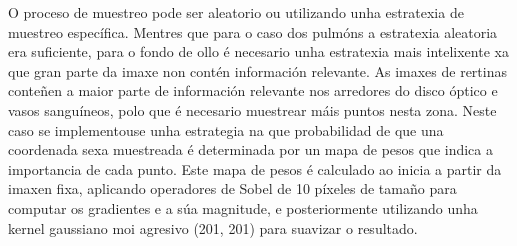 O proceso de muestreo pode ser aleatorio ou utilizando unha estratexia de muestreo específica.
Mentres que para o caso dos pulmóns a estratexia aleatoria era suficiente, para o fondo de ollo é necesario unha estratexia mais intelixente xa que gran parte da imaxe non contén información relevante.
As imaxes de rertinas conteñen a maior parte de información relevante nos arredores do disco óptico e vasos sanguíneos, polo que é necesario muestrear máis puntos nesta zona.
Neste caso se implementouse unha estrategia na que probabilidad de que una coordenada sexa muestreada é determinada por un mapa de pesos que indica a importancia de cada punto.
Este mapa de pesos é calculado ao inicia a partir da imaxen fixa, aplicando operadores de Sobel de 10 píxeles de tamaño para computar os gradientes e a súa magnitude, e posteriormente utilizando unha kernel gaussiano moi agresivo (201, 201) para suavizar o resultado.
